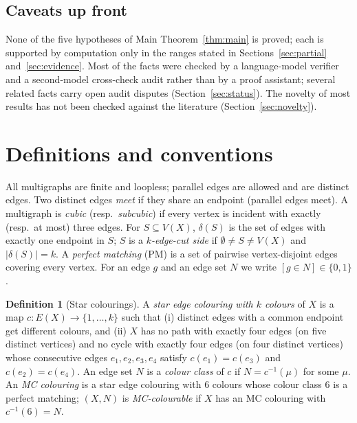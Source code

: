 \documentclass[11pt]{amsart}
\theoremstyle{definition}
\newtheorem{definition}[theorem]{Definition}
\theoremstyle{remark}
\begin{document}
\subsection*{Caveats up front}
None of the five hypotheses of Main Theorem~\ref{thm:main} is proved; each is supported by computation only in the ranges stated in Sections~\ref{sec:partial} and~\ref{sec:evidence}. Most of the facts were checked by a language-model verifier and a second-model cross-check audit rather than by a proof assistant; several related facts carry open audit disputes (Section~\ref{sec:status}). The novelty of most results has not been checked against the literature (Section~\ref{sec:novelty}).

\section{Definitions and conventions}\label{sec:prelim}

All multigraphs are finite and loopless; parallel edges are allowed and are distinct edges. Two distinct edges \emph{meet} if they share an endpoint (parallel edges meet). A multigraph is \emph{cubic} (resp.\ \emph{subcubic}) if every vertex is incident with exactly (resp.\ at most) three edges. For $S\subseteq V(X)$, $\delta(S)$ is the set of edges with exactly one endpoint in $S$; $S$ is a \emph{$k$-edge-cut side} if $\emptyset\ne S\ne V(X)$ and $|\delta(S)|=k$. A \emph{perfect matching} (PM) is a set of pairwise vertex-disjoint edges covering every vertex. For an edge $g$ and an edge set $N$ we write $[g\in N]\in\{0,1\}$.

\begin{definition}[Star colourings]\label{def:star}
A \emph{star edge colouring with $k$ colours} of $X$ is a map $c\colon E(X)\to\{1,\dots,k\}$ such that (i) distinct edges with a common endpoint get different colours, and (ii) $X$ has no path with exactly four edges (on five distinct vertices) and no cycle with exactly four edges (on four distinct vertices) whose consecutive edges $e_1,e_2,e_3,e_4$ satisfy $c(e_1)=c(e_3)$ and $c(e_2)=c(e_4)$. An edge set $N$ is a \emph{colour class} of $c$ if $N=c^{-1}(\mu)$ for some $\mu$. An \emph{MC colouring} is a star edge colouring with $6$ colours whose colour class $6$ is a perfect matching; $(X,N)$ is \emph{MC-colourable} if $X$ has an MC colouring with $c^{-1}(6)=N$.
\end{definition}
\end{document}
